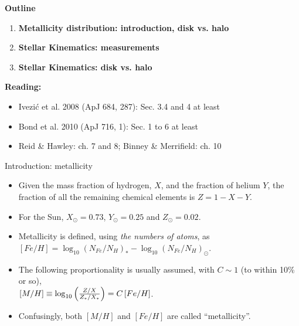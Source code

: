 \documentclass[letterpaper,landscape]{slides}
\begin{document}
\begin{slide}
\begin{center}
\bfseries
{\large {\color{blue} Outline} }
\end{center}
\vskip -1.2in

\begin{enumerate}
            \item {\bf Metallicity distribution: introduction, disk vs. halo}
             \item {\bf Stellar Kinematics: measurements}
             \item {\bf Stellar Kinematics: disk vs. halo}
\end{enumerate}
\vskip -0.3in
{\color{red} \bf Reading:}
\vskip -0.3in
   \begin{itemize}
   \item {\color{blue} Ivezi\'{c} et al. 2008 (ApJ 684, 287):} Sec. 3.4 and 4 at least
   \item {\color{blue} Bond et al. 2010 (ApJ 716, 1):} Sec. 1 to 6 at least 
   \item {Reid \& Hawley:} ch. 7 and 8; {Binney \& Merrifield:} ch. 10
\end{itemize}


\vfill
\end{slide}
 




\begin{slide}
\begin{center}
{\large \color{red} Introduction: metallicity}
\end{center}

\begin{itemize}
\item
Given the {\color{red} mass fraction} of hydrogen, $X$, and the fraction of helium $Y$, the fraction of all the remaining chemical 
elements is $Z = 1 - X - Y$. 
\item 
For the Sun, $X_\odot=0.73$, $Y_\odot=0.25$ and $Z_\odot = 0.02$.
\item Metallicity is defined, using {\color{red} {\it the numbers of atoms}}, as \\
   $ [Fe/H] = \log_{10}\left( N_{Fe} / N_H \right)_{\ast} - \log_{10}\left( N_{Fe} / N_H \right)_\odot$. 
\item 
The following proportionality is usually assumed, with $C\sim 1$ (to within 10\% or so), \\
$ [M/H] \equiv \log_{10}\left({ Z/X \over Z_\ast / X_\ast }\right)  = C \, [Fe/H]$. 
\item Confusingly, both $[M/H]$ and $[Fe/H]$ are called ``metallicity''. 
\end{itemize}  


\vfill
\end{slide}
\end{document}
